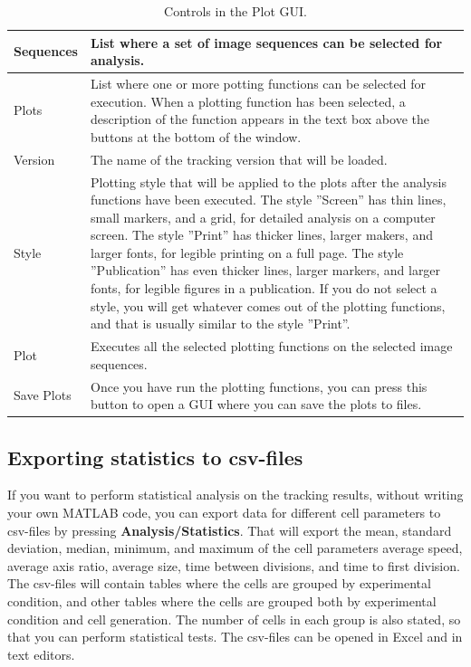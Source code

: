 \documentclass[a4paper, oneside, onecolumn, 11pt]{article}
\newcommand{\menu}[1]{\textbf{#1}}
\begin{document}
\begin{table}[!htb]
\caption{Controls in the Plot GUI.}
\label{tab:plot-GUI}
\begin{tabularx}{\textwidth}{lX}
\hline
Sequences & List where a set of image sequences can be selected for analysis. \\[5pt] \hline

Plots & List where one or more potting functions can be selected for execution. When a plotting function has been selected, a description of the function appears in the text box above the buttons at the bottom of the window. \\[5pt] \hline

Version & The name of the tracking version that will be loaded. \\[5pt] \hline

Style & Plotting style that will be applied to the plots after the analysis functions have been executed. The style ''Screen'' has thin lines, small markers, and a grid, for detailed analysis on a computer screen. The style ''Print'' has thicker lines, larger makers, and larger fonts, for legible printing on a full page. The style ''Publication'' has even thicker lines, larger markers, and larger fonts, for legible figures in a publication. If you do not select a style, you will get whatever comes out of the plotting functions, and that is usually similar to the style ''Print''.\\[5pt] \hline

Plot & Executes all the selected plotting functions on the selected image sequences. \\[5pt] \hline

Save Plots & Once you have run the plotting functions, you can press this button to open a GUI where you can save the plots to files. \\[5pt] \hline
\end{tabularx}
\end{table}

\subsection{Exporting statistics to csv-files}
If you want to perform statistical analysis on the tracking results, without writing your own MATLAB code, you can export data for different cell parameters to csv-files by pressing \menu{Analysis/\allowbreak Statistics}. That will export the mean, standard deviation, median, minimum, and maximum of the cell parameters average speed, average axis ratio, average size, time between divisions, and time to first division. The csv-files will contain tables where the cells are grouped by experimental condition, and other tables where the cells are grouped both by experimental condition and cell generation. The number of cells in each group is also stated, so that you can perform statistical tests. The csv-files can be opened in Excel and in text editors.
\end{document}
